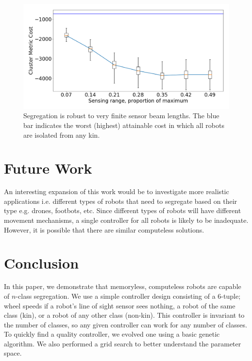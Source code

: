 \documentclass[conference]{IEEEtran}
\begin{document}
    \begin{figure}
      \centering
      \includegraphics[width=1\linewidth]{./images/beam_length.png}
      \caption{Segregation is robust to very finite sensor beam lengths. The blue bar indicates the worst (highest) attainable cost in which all robots are isolated from any kin.}
      \label{fig:beam_length}
    \end{figure}

\section{Future Work}
An interesting expansion of this work would be to investigate more realistic applications i.e. different types of robots that need to segregate based on their type e.g. drones, footbots, etc. Since different types of robots will have different movement mechanisms, a single controller for all robots is likely to be inadequate. However, it is possible that there are similar computeless solutions.


\section{Conclusion}
In this paper, we demonstrate that memoryless, computeless robots are capable of $n$-class segregation. We use a simple controller design consisting of a 6-tuple; wheel speeds if a robot's line of sight sensor sees nothing, a robot of the same class (kin), or a robot of any other class (non-kin). This controller is invariant to the number of classes, so any given controller can work for any number of classes. To quickly find a quality controller, we evolved one using a basic genetic algorithm. We also performed a grid search to better understand the parameter space.
\end{document}
